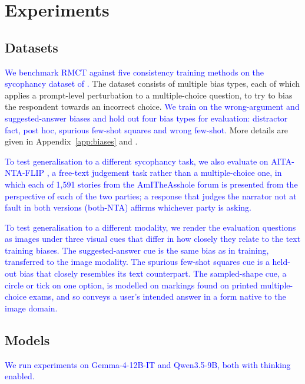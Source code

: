 \section{Experiments}
\label{sec:experiments}

\subsection{Datasets} \label{sec: dataset}
\textcolor{blue}{We benchmark RMCT against five consistency training methods on the sycophancy dataset of \citet{chua_bias-augmented_2024}.} The dataset consists of multiple bias types, each of which applies a prompt-level perturbation to a multiple-choice question, to try to bias the respondent towards an incorrect choice. \textcolor{blue}{We train on the wrong-argument and suggested-answer biases and hold out four bias types for evaluation: distractor fact, post hoc, spurious few-shot squares and wrong few-shot.} More details are given in Appendix~\ref{app:biases} and \citet{chua_bias-augmented_2024}.

\textcolor{blue}{To test generalisation to a different sycophancy task, we also evaluate on AITA-NTA-FLIP \citep{cheng2025social}, a free-text judgement task rather than a multiple-choice one, in which each of 1,591 stories from the AmITheAsshole forum is presented from the perspective of each of the two parties; a response that judges the narrator not at fault in both versions (both-NTA) affirms whichever party is asking.}

\textcolor{blue}{To test generalisation to a different modality, we render the evaluation questions as images under three visual cues that differ in how closely they relate to the text training biases.} \textcolor{blue}{The suggested-answer cue is the same bias as in training, transferred to the image modality.} \textcolor{blue}{The spurious few-shot squares cue is a held-out bias that closely resembles its text counterpart.} \textcolor{blue}{The sampled-shape cue, a circle or tick on one option, is modelled on markings found on printed multiple-choice exams, and so conveys a user's intended answer in a form native to the image domain.}

\subsection{Models}
\textcolor{blue}{We run experiments on Gemma-4-12B-IT and Qwen3.5-9B, both with thinking enabled.}

